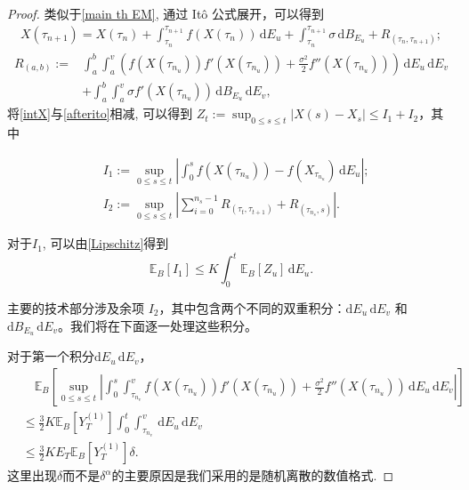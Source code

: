 \begin{proof}
	类似于\cref{main th EM}, 通过 Itô 公式展开，可以得到
	\begin{align}\label{afterito}
		X(\tau_{n+1}) = X(\tau_n) +  \int_{\tau_n}^{\tau_{n+1}} f(X(\tau_n)) \, \mathrm{d}E_u + \int_{\tau_n}^{\tau_{n+1}} \sigma \, \mathrm{d}B_{E_u} + R_{(\tau_n, \tau_{n+1})}; 
	\end{align}
	\begin{align*}
		R_{(a,b)} :=&  \int_a^b \int_a^{v} \left( f(X(\tau_{n_{u}}))f'(X(\tau_{n_{u}})) + \frac{\sigma ^2}{2} f''(X(\tau_{n_{u}}))  \right) \, \mathrm{d}E_{u} \, \mathrm{d}E_{v} \\
		&+ \int_a^b \int_a^{v} \sigma f'(X(\tau_{n_{u}}))   \, \mathrm{d}B_{E_{u}} \,\nonumber \mathrm{d}E_{v},
	\end{align*}
	将\cref{intX}与\cref{afterito}相减, 可以得到
	$Z_t := \sup_{0 \leq s \leq t} | X(s) - X_s | \leq I_1 + I_2 $，其中
	
	$$
	\begin{aligned}
		&I_1 := \sup_{0 \leq s \leq t} \left| \int_0^s f(X(\tau_{n_u})) - f(X_{\tau_{n_u}})  \, \mathrm{d}E_u \right|; \\
		&I_2 := \sup_{0 \leq s \leq t} \left| \sum_{i=0}^{n_s - 1} R_{(\tau_{t}, \tau_{t+1})} + R_{(\tau_{n_s}, s)} \right|.
	\end{aligned}
	$$
	
	对于$I_1$, 可以由\cref{Lipschitz}得到
	\begin{equation}\label{I1}
		\mathbb{E}_B[I_1] \leq K \int_0^t \mathbb{E}_B[Z_u] \, \mathrm{d}E_u.
	\end{equation}

	主要的技术部分涉及余项 $I_2$，其中包含两个不同的双重积分：$\mathrm{d}E_{u} \, \mathrm{d}E_{v}$ 和 $\mathrm{d}B_{E_{u}} \, \mathrm{d}E_{v}$。我们将在下面逐一处理这些积分。
	
	对于第一个积分$ \mathrm{d}E_{u} \, \mathrm{d}E_{v}$，
	\begin{align}
		& \quad \mathbb{E}_B \left[\sup_{0 \leq s \leq t} \left| \int_0^s \int_{\tau_{n_v}}^{v} f(X(\tau_{n_{u}}))f'(X(\tau_{n_{u}}))  + \frac{\sigma^2}{2} f''(X(\tau_{n_{u}})) \, \mathrm{d}E_{u} \, \mathrm{d}E_{v} \right|\right] \nonumber \\
		&\leq  \frac{3}{2}K \mathbb{E}_B[Y_T^{(1)}] \int_0^t \int_{\tau_{n_{v}}}^{v} \, \mathrm{d}E_{u} \, \mathrm{d}E_{v} \nonumber \\
		&\leq  \frac{3}{2}K E_T \mathbb{E}_B[Y_T^{(1)}] \delta.  \label{I21}
	\end{align}
	这里出现$\delta$而不是$\delta^{\alpha}$的主要原因是我们采用的是随机离散的数值格式.
	

\end{proof}
